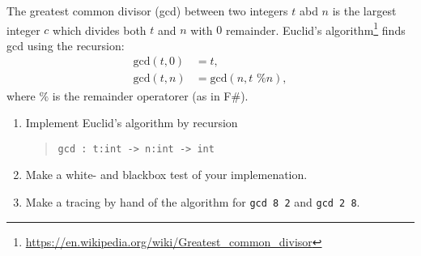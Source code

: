 \label{gcd} The greatest common divisor (gcd) between two integers $t$
abd $n$ is the largest integer $c$ which divides both $t$ and $n$ with
$0$ remainder. Euclid's
algorithm\footnote{\url{https://en.wikipedia.org/wiki/Greatest_common_divisor}}
finds gcd using the recursion:
  \begin{align}
    \text{gcd}(t,0) &= t, \label{gcd:1}
    \\ \text{gcd}(t,n) &= \text{gcd}(n, t \text{ \% } n), \label{gcd:2}
  \end{align}
where $\%$ is the remainder operatorer (as in F\#). 
\begin{enumerate}
\item Implement Euclid's algorithm by recursion
  \begin{quote}
    \lstinline{gcd : t:int -> n:int -> int}
  \end{quote}
\item Make a white- and blackbox test of your implemenation.
\item Make a tracing by hand of the algorithm for \lstinline{gcd 8 2} and \lstinline{gcd 2 8}.
\end{enumerate}
